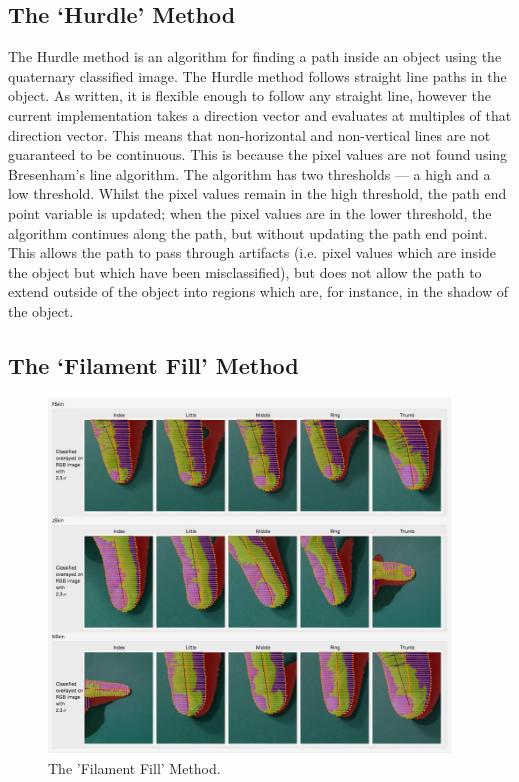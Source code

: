 \clearpage
\subsection{The `Hurdle' Method}\label{sec:HurdleMethod}
The Hurdle method is an algorithm for finding a path inside an object using the quaternary classified image. The Hurdle method follows straight line paths in the object. As written, it is flexible enough to follow any straight line, however the current implementation takes a direction vector and evaluates at multiples of that direction vector. This means that non-horizontal and non-vertical lines are not guaranteed to be continuous. This is because the pixel values are not found using Bresenham's line algorithm. The algorithm has two thresholds --- a high and a low threshold. Whilst the pixel values remain in the high threshold, the path end point variable is updated; when the pixel values are in the lower threshold, the algorithm continues along the path, but without updating the path end point. This allows the path to pass through artifacts (i.e. pixel values which are inside the object but which have been misclassified), but does not allow the path to extend outside of the object into regions which are, for instance, in the shadow of the object.
 
\subsection{The `Filament Fill' Method}\label{sec:FilamentFill}

\begin{figure}[h!]
  \centering
    \includegraphics[width=0.95\textwidth]{Chapter4/Figs/FillamentFill.jpg}
    \caption{The 'Filament Fill' Method.}\label{fig:FillamentFill}
\end{figure}

